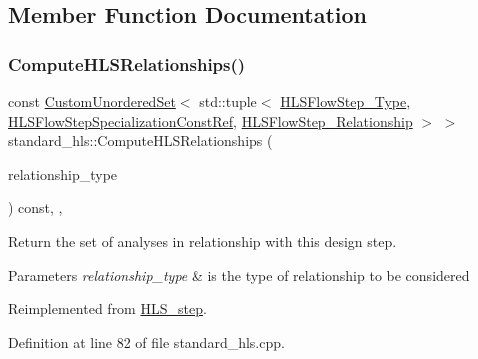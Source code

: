 \subsection{Member Function Documentation}
\mbox{\label{classstandard__hls_a7a8577eba64be4ca572350446879d82c}} 
\subsubsection{\texorpdfstring{Compute\+H\+L\+S\+Relationships()}{ComputeHLSRelationships()}}
{\footnotesize\ttfamily const \hyperlink{classCustomUnorderedSet}{Custom\+Unordered\+Set}$<$ std\+::tuple$<$ \hyperlink{hls__step_8hpp_ada16bc22905016180e26fc7e39537f8d}{H\+L\+S\+Flow\+Step\+\_\+\+Type}, \hyperlink{hls__step_8hpp_a5fdd2edf290c196531d21d68e13f0e74}{H\+L\+S\+Flow\+Step\+Specialization\+Const\+Ref}, \hyperlink{hls__step_8hpp_a3ad360b9b11e6bf0683d5562a0ceb169}{H\+L\+S\+Flow\+Step\+\_\+\+Relationship} $>$ $>$ standard\+\_\+hls\+::\+Compute\+H\+L\+S\+Relationships (\begin{DoxyParamCaption}\item[{const \hyperlink{classDesignFlowStep_a723a3baf19ff2ceb77bc13e099d0b1b7}{Design\+Flow\+Step\+::\+Relationship\+Type}}]{relationship\+\_\+type }\end{DoxyParamCaption}) const\hspace{0.3cm}{\ttfamily [override]}, {\ttfamily [protected]}, {\ttfamily [virtual]}}



Return the set of analyses in relationship with this design step. 


\begin{DoxyParams}{Parameters}
{\em relationship\+\_\+type} & is the type of relationship to be considered \\
\hline
\end{DoxyParams}


Reimplemented from \hyperlink{classHLS__step_aed0ce8cca9a1ef18e705fc1032ad4de5}{H\+L\+S\+\_\+step}.



Definition at line 82 of file standard\+\_\+hls.\+cpp.



